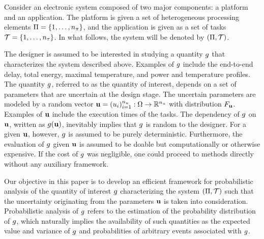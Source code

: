 Consider an electronic system composed of two major components: a platform and
an application. The platform is given a set of heterogeneous processing elements
$\Pi = \{ 1, \dots, {n_\pi} \}$, and the application is given as a set of tasks
$\mathcal{T} = \{ 1, \dots, {n_\tau} \}$. In what follows, the system will be denoted by
$(\Pi, \mathcal{T})$.

The designer is assumed to be interested in studying a quantity $g$ that
characterizes the system described above. Examples of $g$ include the
end-to-end delay, total energy, maximal temperature, and power and temperature
profiles. The quantity $g$, referred to as the quantity of interest, depends on
a set of parameters that are uncertain at the design stage. The uncertain
parameters are modeled by a random vector $\mathbf{u} = (u_i)_{i = 1}^{n_u}: \Omega
\to \mathbb{R}^{n_u}$ with distribution $F_{\mathbf{u}}$. Examples of $\mathbf{u}$ include
the execution times of the tasks. The dependency of $g$ on $\mathbf{u}$, written as
$g(\mathbf{u})$, inevitably implies that $g$ is random to the designer. For a given
$\mathbf{u}$, however, $g$ is assumed to be purely deterministic. Furthermore, the
evaluation of $g$ given $\mathbf{u}$ is assumed to be doable but computationally or
otherwise expensive. If the cost of $g$ was negligible, one could proceed to
 methods directly without any auxiliary framework.

Our objective in this paper is to develop an efficient framework for
probabilistic analysis of the quantity of interest $g$ characterizing the
system $(\Pi, \mathcal{T})$ such that the uncertainty originating from the
parameters $\mathbf{u}$ is taken into consideration. Probabilistic analysis of $g$
refers to the estimation of the probability distribution of $g$, which
naturally implies the availability of such quantities as the expected value and
variance of $g$ and probabilities of arbitrary events associated with $g$.
